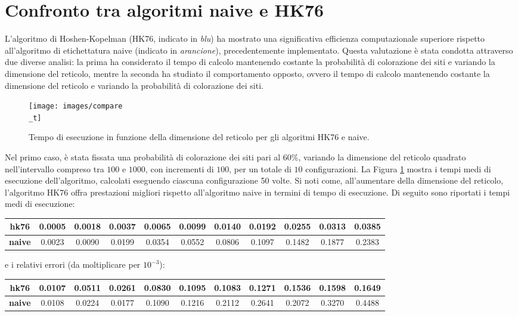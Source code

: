 \section{Confronto tra algoritmi naive e HK76}

L'algoritmo di Hoshen-Kopelman (HK76, indicato in \textit{blu}) ha mostrato una significativa efficienza computazionale superiore rispetto all'algoritmo di etichettatura naive (indicato in \textit{arancione}), precedentemente implementato. Questa valutazione è stata condotta attraverso due diverse analisi: la prima ha considerato il tempo di calcolo mantenendo costante la probabilità di colorazione dei siti e variando la dimensione del reticolo, mentre la seconda ha studiato il comportamento opposto, ovvero il tempo di calcolo mantenendo costante la dimensione del reticolo e variando la probabilità di colorazione dei siti.
\begin{figure}[H]
	\centering
	\texttt{[image: images/compare\\\_t]}
	\caption{Tempo di esecuzione in funzione della dimensione del reticolo per gli algoritmi HK76 e naive.}
	\label{fig:comparet}
\end{figure}
\noindent
Nel primo caso, è stata fissata una probabilità di colorazione dei siti pari al $60\%$, variando la dimensione del reticolo quadrato nell'intervallo compreso tra $100$ e $1000$, con incrementi di $100$, per un totale di $10$ configurazioni. La Figura \ref{fig:comparet} mostra i tempi medi di esecuzione dell'algoritmo, calcolati eseguendo ciascuna configurazione 50 volte. Si noti come, all’aumentare della dimensione del reticolo, l’algoritmo HK76 offra prestazioni migliori rispetto all’algoritmo naive in termini di tempo di esecuzione. Di seguito sono riportati i tempi medi di esecuzione:

\vspace{15px}
\noindent
\begin{tabular}{|c|*{10}{c|}}
	\hline
	\textbf{hk76} &0.0005 &	0.0018 &	0.0037 &	0.0065 &	0.0099 &	0.0140 &	0.0192 &	0.0255 &	0.0313 &	0.0385 \\
	\hline
	\textbf{naive} & 0.0023  &  0.0090  &  0.0199 &   0.0354 &   0.0552  &  0.0806 &   0.1097  &  0.1482 &   0.1877  &  0.2383\\
	\hline
\end{tabular}

\vspace{15px}
\noindent
e i relativi errori (da moltiplicare per $10^{-3}$):

\vspace{15px}
\noindent
\begin{tabular}{|c|*{10}{c|}}
	\hline
	\textbf{hk76}  & 0.0107  &  0.0511    &0.0261 &   0.0830   & 0.1095   & 0.1083  &  0.1271  &  0.1536  &  0.1598  &  0.1649\\
	\hline
	\textbf{naive}  &0.0108  &  0.0224  &  0.0177  &  0.1090  &  0.1216  &  0.2112   & 0.2641  &  0.2072&    0.3270  &  0.4488\\
	\hline
\end{tabular}

